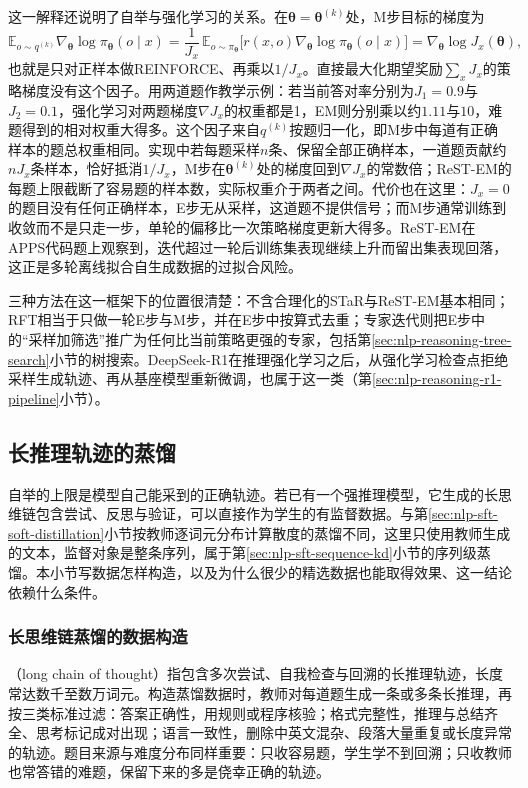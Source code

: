 这一解释还说明了自举与强化学习的关系。在$\bm\theta=\bm\theta^{(k)}$处，M步目标的梯度为
\[
  \mathbb E_{o\sim q^{(k)}}\nabla_{\bm\theta}\log\pi_{\bm\theta}(o\mid x)
  =\frac{1}{J_x}\,\mathbb E_{o\sim\pi_{\bm\theta}}\bigl[r(x,o)\nabla_{\bm\theta}\log\pi_{\bm\theta}(o\mid x)\bigr]
  =\nabla_{\bm\theta}\log J_x(\bm\theta),
\]
也就是只对正样本做REINFORCE、再乘以$1/J_x$。直接最大化期望奖励$\sum_xJ_x$的策略梯度没有这个因子。用两道题作教学示例：若当前答对率分别为$J_1=0.9$与$J_2=0.1$，强化学习对两题梯度$\nabla J_x$的权重都是1，EM则分别乘以约$1.11$与$10$，难题得到的相对权重大得多。这个因子来自$q^{(k)}$按题归一化，即M步中每道有正确样本的题总权重相同。实现中若每题采样$n$条、保留全部正确样本，一道题贡献约$nJ_x$条样本，恰好抵消$1/J_x$，M步在$\bm\theta^{(k)}$处的梯度回到$\nabla J_x$的常数倍；ReST-EM的每题上限截断了容易题的样本数，实际权重介于两者之间。代价也在这里：$J_x=0$的题目没有任何正确样本，E步无从采样，这道题不提供信号；而M步通常训练到收敛而不是只走一步，单轮的偏移比一次策略梯度更新大得多。ReST-EM在APPS代码题上观察到，迭代超过一轮后训练集表现继续上升而留出集表现回落，这正是多轮离线拟合自生成数据的过拟合风险。

三种方法在这一框架下的位置很清楚：不含合理化的STaR与ReST-EM基本相同；RFT相当于只做一轮E步与M步，并在E步中按算式去重；专家迭代则把E步中的“采样加筛选”推广为任何比当前策略更强的专家，包括第\ref{sec:nlp-reasoning-tree-search}小节的树搜索。DeepSeek-R1在推理强化学习之后，从强化学习检查点拒绝采样生成轨迹、再从基座模型重新微调，也属于这一类（第\ref{sec:nlp-reasoning-r1-pipeline}小节）。

\subsection{长推理轨迹的蒸馏}
\label{sec:nlp-reasoning-distillation}

自举的上限是模型自己能采到的正确轨迹。若已有一个强推理模型，它生成的长思维链包含尝试、反思与验证，可以直接作为学生的有监督数据。与第\ref{sec:nlp-sft-soft-distillation}小节按教师逐词元分布计算散度的蒸馏不同，这里只使用教师生成的文本，监督对象是整条序列，属于第\ref{sec:nlp-sft-sequence-kd}小节的序列级蒸馏。本小节写数据怎样构造，以及为什么很少的精选数据也能取得效果、这一结论依赖什么条件。

\subsubsection{长思维链蒸馏的数据构造}
\label{sec:nlp-reasoning-long-cot-data}

（long chain of thought）指包含多次尝试、自我检查与回溯的长推理轨迹，长度常达数千至数万词元。构造蒸馏数据时，教师对每道题生成一条或多条长推理，再按三类标准过滤：答案正确性，用规则或程序核验；格式完整性，推理与总结齐全、思考标记成对出现；语言一致性，删除中英文混杂、段落大量重复或长度异常的轨迹。题目来源与难度分布同样重要：只收容易题，学生学不到回溯；只收教师也常答错的难题，保留下来的多是侥幸正确的轨迹。

